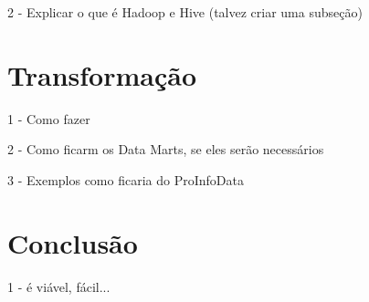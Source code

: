 \documentclass[a4paper,12pt]{article}
\begin{document}
2 - Explicar o que é Hadoop e Hive (talvez criar uma subseção)

\section{\textbf{Transformação}}
1 - Como fazer

2 - Como ficarm os Data Marts, se eles serão necessários

3 - Exemplos como ficaria do ProInfoData

\section{\textbf{Conclusão}}
1 - é viável, fácil...



\end{document}
